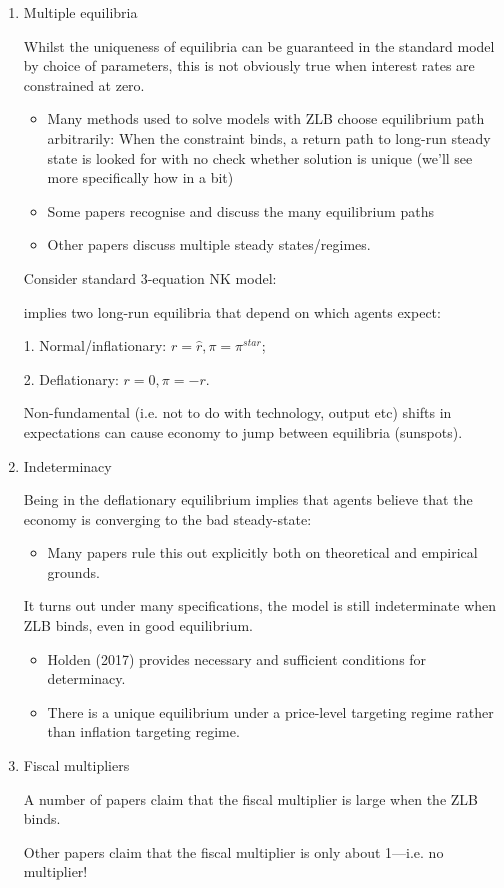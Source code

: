 \documentclass[cn,10pt,math=newtx,citestyle=gb7714-2015,bibstyle=gb7714-2015]{elegantbook}
\begin{document}
\begin{enumerate}
	\item Multiple equilibria
	
	Whilst the uniqueness of equilibria can be guaranteed in the standard model by choice of parameters, this is not obviously true when interest rates are constrained at zero.
	\begin{itemize}
		\item Many methods used to solve models with ZLB choose equilibrium path arbitrarily: When the constraint binds, a return path to long-run steady state is looked for with no check whether solution is unique (we'll see more specifically how in a bit)
		\item Some papers recognise and discuss the many equilibrium paths
		\item Other papers discuss multiple steady states/regimes.
	\end{itemize}
	
	Consider standard 3-equation NK model:
	
	implies two long-run equilibria that depend on which agents expect:
	
	1. Normal/inflationary: $r=\hat{r},\pi=\pi^{star}$;
	
	2. Deflationary: $r=0,\pi=-r$.
	
	Non-fundamental (i.e. not to do with technology, output etc) shifts in expectations can cause economy to jump between equilibria (sunspots).
	
	\item Indeterminacy
	
	Being in the deflationary equilibrium implies that agents believe that the economy is converging to the bad steady-state:
	\begin{itemize}
		\item Many papers rule this out explicitly both on theoretical and empirical grounds.
	\end{itemize}
	
	It turns out under many specifications, the model is still indeterminate when ZLB binds, even in good equilibrium.
	\begin{itemize}
		\item Holden (2017) provides necessary and sufficient conditions for determinacy.
		\item There is a unique equilibrium under a price-level targeting regime rather than inflation targeting regime.
	\end{itemize}
	
	\item Fiscal multipliers
	
	A number of papers claim that the fiscal multiplier is large when the ZLB binds.
	
	Other papers claim that the fiscal multiplier is only about 1---i.e. no multiplier!
\end{enumerate}
\end{document}
